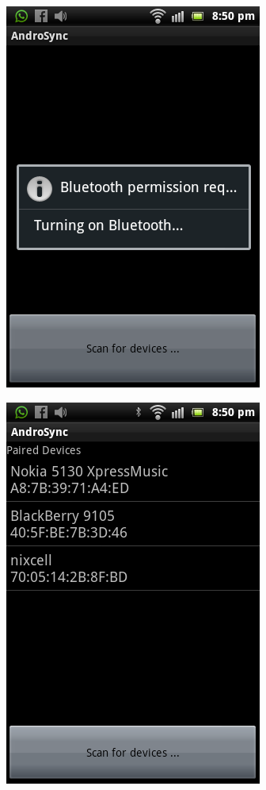 \newpage
\vspace*{1cm}
\begin{figure}[H]
  \centering
    \includegraphics[scale=0.6]{project/images/AndroSyncClient/andro-client05}
\end{figure}
\vspace{1cm}
\begin{figure}[H]
  \centering
    \includegraphics[scale=0.6]{project/images/AndroSyncClient/andro-client06}
\end{figure}
